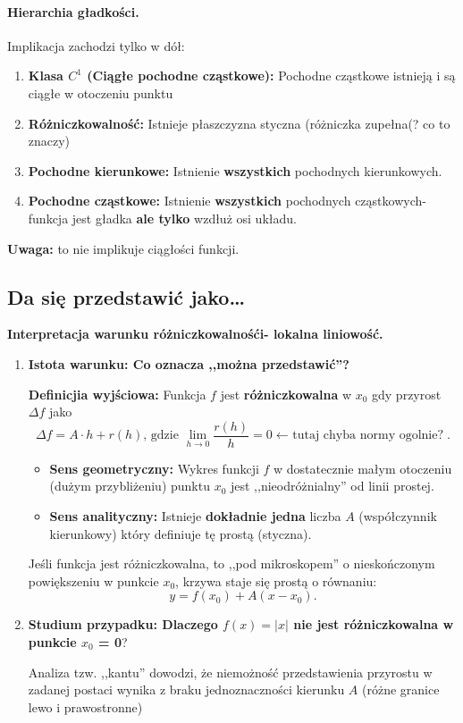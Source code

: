 \paragraph{Hierarchia gładkości.}
Implikacja zachodzi tylko w dół:
\begin{enumerate}
	\item \textbf{Klasa $C^{1}$ (Ciągłe pochodne cząstkowe):} Pochodne cząstkowe istnieją i są ciągłe w otoczeniu punktu 
	\item \textbf{Różniczkowalność:} Istnieje płaszczyzna styczna (różniczka zupełna(? co to znaczy)
	\item \textbf{Pochodne kierunkowe:} Istnienie \textbf{wszystkich} pochodnych kierunkowych.
	\item \textbf{Pochodne cząstkowe:} Istnienie \textbf{wszystkich} pochodnych cząstkowych- funkcja jest gładka \textbf{ale tylko} wzdłuż osi układu. 
\end{enumerate}
\textbf{Uwaga:} to nie implikuje ciągłości funkcji.

\subsection{Da się przedstawić jako\ldots}
\textbf{Interpretacja warunku różniczkowalnośći- lokalna liniowość.} 
\begin{enumerate}[label=\arabic*.]
	\item \textbf{Istota warunku: Co oznacza ,,można przedstawić''?} 

\textbf{Definicjia wyjściowa:} Funkcja $f$ jest \textbf{różniczkowalna} w $x_0$ gdy przyrost $\Delta f$ jako
\[
\Delta f = A\cdot h + r\left( h \right) \text{, gdzie }  \lim_{h \to 0} \frac{r\left( h \right) }{h} = 0 \text{$\leftarrow$ tutaj chyba normy ogolnie?}
.\] 
\begin{itemize}
	\item \textbf{Sens geometryczny:} Wykres funkcji $f$ w dostatecznie małym otoczeniu (dużym przybliżeniu) punktu $x_0$ jest ,,nieodróżnialny'' od linii prostej.
	\item \textbf{Sens analityczny:} Istnieje \textbf{dokładnie jedna} liczba $A$ (współczynnik kierunkowy) który definiuje tę prostą (styczna).
\end{itemize}
\begin{intuition}
	Jeśli funkcja jest różniczkowalna, to ,,pod mikroskopem'' o nieskończonym powiększeniu w punkcie $x_0$, krzywa staje się prostą o równaniu:
	\[
	y = f\left( x_0 \right) + A\left( x-x_0 \right) 
	.\] 
\end{intuition} 
\item \textbf{Studium przypadku: Dlaczego $f\left( x \right) = \left| x \right| $ nie jest różniczkowalna w punkcie $x_0$ = 0}?

	Analiza tzw. ,,kantu'' dowodzi, że niemożność przedstawienia przyrostu w zadanej postaci wynika z braku jednoznaczności kierunku $A$ (różne granice lewo i prawostronne)
\end{enumerate}

